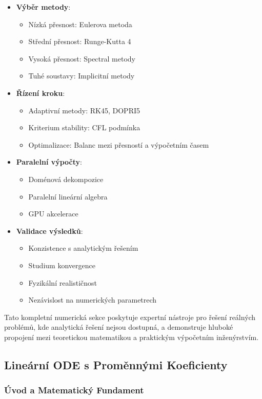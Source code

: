 \begin{itemize}
\item \textbf{Výběr metody}: 
\begin{itemize}
\item Nízká přesnost: Eulerova metoda
\item Střední přesnost: Runge-Kutta 4
\item Vysoká přesnost: Spectral metody
\item Tuhé soustavy: Implicitní metody
\end{itemize}

\item \textbf{Řízení kroku}: 
\begin{itemize}
\item Adaptivní metody: RK45, DOPRI5
\item Kriterium stability: CFL podmínka
\item Optimalizace: Balanc mezi přesností a výpočetním časem
\end{itemize}

\item \textbf{Paralelní výpočty}:
\begin{itemize}
\item Doménová dekompozice
\item Paralelní lineární algebra
\item GPU akcelerace
\end{itemize}

\item \textbf{Validace výsledků}:
\begin{itemize}
\item Konzistence s analytickým řešením
\item Studium konvergence
\item Fyzikální realističnost
\item Nezávislost na numerických parametrech
\end{itemize}
\end{itemize}

Tato kompletní numerická sekce poskytuje expertní nástroje pro řešení reálných problémů, kde analytická řešení nejsou dostupná, a demonstruje hluboké propojení mezi teoretickou matematikou a praktickým výpočetním inženýrstvím.

\subsection{Lineární ODE s Proměnnými Koeficienty}

\subsubsection{Úvod a Matematický Fundament}

